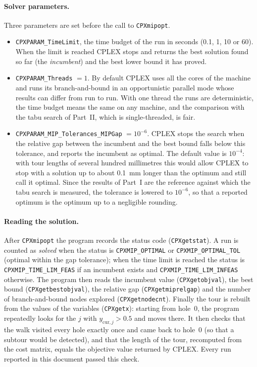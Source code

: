 \documentclass[11pt,a4paper]{article}
\begin{document}
\paragraph{Solver parameters.}
Three parameters are set before the call to \texttt{CPXmipopt}.
\begin{itemize}
  \item \texttt{CPXPARAM\_TimeLimit}, the time budget of the run in seconds (0.1, 1, 10 or
    60). When the limit is reached CPLEX stops and returns the best solution found so far
    (the \emph{incumbent}) and the best lower bound it has proved.
  \item \texttt{CPXPARAM\_Threads} $=1$. By default CPLEX uses all the cores of the machine
    and runs its branch-and-bound in an opportunistic parallel mode whose results can differ
    from run to run. With one thread the runs are deterministic, the time budget means the
    same on any machine, and the comparison with the tabu search of Part~II, which is
    single-threaded, is fair.
  \item \texttt{CPXPARAM\_MIP\_Tolerances\_MIPGap} $=10^{-6}$. CPLEX stops the search when the
    relative gap between the incumbent and the best bound falls below this tolerance, and
    reports the incumbent as optimal. The default value is $10^{-4}$: with tour lengths of
    several hundred millimetres this would allow CPLEX to stop with a solution up to about
    0.1~mm longer than the optimum and still call it optimal. Since the results of Part~I are
    the reference against which the tabu search is measured, the tolerance is lowered to
    $10^{-6}$, so that a reported optimum is the optimum up to a negligible rounding.
\end{itemize}

\paragraph{Reading the solution.}
After \texttt{CPXmipopt} the program records the status code (\texttt{CPXgetstat}). A run is
counted as \emph{solved} when the status is \texttt{CPXMIP\_OPTIMAL} or
\texttt{CPXMIP\_OPTIMAL\_TOL} (optimal within the gap tolerance); when the time limit is
reached the status is \texttt{CPXMIP\_TIME\_LIM\_FEAS} if an incumbent exists and
\texttt{CPXMIP\_TIME\_LIM\_INFEAS} otherwise. The program then reads the incumbent value
(\texttt{CPXgetobjval}), the best bound (\texttt{CPXgetbestobjval}), the relative gap
(\texttt{CPXgetmiprelgap}) and the number of branch-and-bound nodes explored
(\texttt{CPXgetnodecnt}). Finally the tour is rebuilt from the values of the variables
(\texttt{CPXgetx}): starting from hole~0, the program repeatedly looks for the $j$ with
$y_{\text{cur},j}>0.5$ and moves there. It then checks that the walk visited every hole
exactly once and came back to hole~0 (so that a subtour would be detected), and that the
length of the tour, recomputed from the cost matrix, equals the objective value returned by
CPLEX. Every run reported in this document passed this check.
\end{document}
